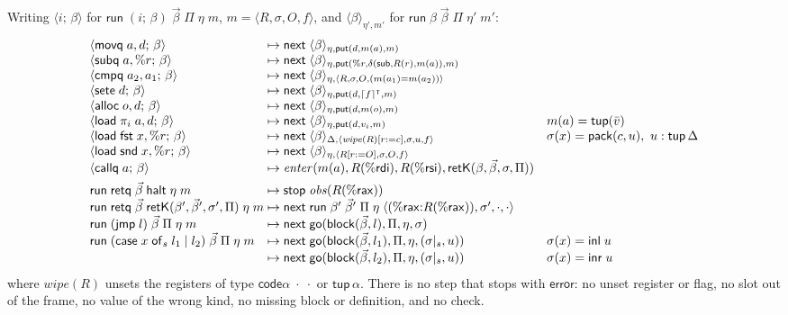 \documentclass[10pt]{article}
\theoremstyle{acmplain}
\newcommand{\key}[1]{\mathsf{#1}}
\newcommand{\nxt}{\key{next}\;}
\newcommand{\stp}{\key{stop}\;}
\newcommand{\error}{\key{error}}
\newcommand{\obs}{\mathit{obs}}
\newcommand{\tupV}[1]{\key{tup}(#1)}
\newcommand{\inlV}{\key{inl}\;}
\newcommand{\inrV}{\key{inr}\;}
\newcommand{\halt}{\key{halt}}
\newcommand{\rax}{\%\key{rax}}
\newcommand{\rdi}{\%\key{rdi}}
\newcommand{\rsi}{\%\key{rsi}}
\newcommand{\xrun}{\key{run}}
\newcommand{\Tpack}[2]{\key{pack}(#1, #2)}     %
\newcommand{\Tcut}[2]{#1|_{#2}}                %
\newcommand{\Tres}[1]{\lceil #1 \rceil^{\mathsf{T}}}      %
\newcommand{\tupA}{\key{tup}\,\alpha}                     %
\newcommand{\Twipe}[1]{\mathit{wipe}(#1)}
\newcommand{\Mtup}[1]{\key{tup}\,#1}                      %
\newcommand{\codeAB}[2]{\key{code}\alpha\;#1\;#2}         %
\newcommand{\Mxcase}[4]{\key{case}\;#1\;\key{of}_{#2}\;#3 \mid #4}  %
\begin{document}
Writing $\langle i;\, \beta \rangle$ for $\xrun\;(i;\, \beta)\;\vec{\beta}\;\Pi\;\eta\;m$,
$m = \langle R, \sigma, O, f \rangle$, and $\langle \beta \rangle_{\eta', m'}$ for
$\xrun\;\beta\;\vec{\beta}\;\Pi\;\eta'\;m'$:
\[
\begin{array}{@{}l@{\;\mapsto\;}l@{\quad}l@{}}
  \langle \key{movq}\; a, d;\, \beta \rangle & \nxt \langle \beta \rangle_{\eta, \key{put}(d, m(a), m)} \\
  \langle \key{subq}\; a, \%r;\, \beta \rangle & \nxt \langle \beta \rangle_{\eta, \key{put}(\%r, \delta(\key{sub}, R(r), m(a)), m)} \\
  \langle \key{cmpq}\; a_2, a_1;\, \beta \rangle & \nxt \langle \beta \rangle_{\eta, \langle R, \sigma, O, (m(a_1) = m(a_2)) \rangle} \\
  \langle \key{sete}\; d;\, \beta \rangle & \nxt \langle \beta \rangle_{\eta, \key{put}(d, \Tres{f}, m)} \\
  \langle \key{alloc}\; o, d;\, \beta \rangle & \nxt \langle \beta \rangle_{\eta, \key{put}(d, m(o), m)} \\
  \langle \key{load}\; \pi_i\; a, d;\, \beta \rangle & \nxt \langle \beta \rangle_{\eta, \key{put}(d, v_i, m)}
    & m(a) = \tupV{\bar{v}} \\
  \langle \key{load}\; \key{fst}\; x, \%r;\, \beta \rangle & \nxt \langle \beta \rangle_{\Delta, \langle \Twipe{R}[r := c], \sigma, u, f \rangle}
    & \sigma(x) = \Tpack{c}{u},\ u : \Mtup{\Delta} \\
  \langle \key{load}\; \key{snd}\; x, \%r;\, \beta \rangle & \nxt \langle \beta \rangle_{\eta, \langle R[r := O], \sigma, O, f \rangle} \\
  \langle \key{callq}\; a;\, \beta \rangle & \mathit{enter}(m(a), R(\rdi), R(\rsi), \key{retK}(\beta, \vec{\beta}, \sigma, \Pi)) \\[1ex]
  \xrun\;\key{retq}\;\vec{\beta}\;\halt\;\eta\;m & \stp \obs(R(\rax)) \\
  \xrun\;\key{retq}\;\vec{\beta}\;\key{retK}(\beta', \vec{\beta}', \sigma', \Pi)\;\eta\;m &
    \nxt \xrun\;\beta'\;\vec{\beta}'\;\Pi\;\eta\;\langle (\rax{:}R(\rax)), \sigma', \cdot, \cdot \rangle \\
  \xrun\;(\key{jmp}\; l)\;\vec{\beta}\;\Pi\;\eta\;m & \nxt \key{go}(\key{block}(\vec{\beta}, l), \Pi, \eta, \sigma) \\
  \xrun\;(\Mxcase{x}{s}{l_1}{l_2})\;\vec{\beta}\;\Pi\;\eta\;m & \nxt \key{go}(\key{block}(\vec{\beta}, l_1), \Pi, \eta, (\Tcut{\sigma}{s}, u)) & \sigma(x) = \inlV u \\
  & \nxt \key{go}(\key{block}(\vec{\beta}, l_2), \Pi, \eta, (\Tcut{\sigma}{s}, u)) & \sigma(x) = \inrV u
\end{array}
\]
where $\Twipe{R}$ unsets the registers of type $\codeAB{\cdot}{\cdot}$ or
$\tupA$. There is no step that stops with $\error$: no unset register or
flag, no slot out of the frame, no value of the wrong kind, no missing
block or definition, and no check.
\end{document}
